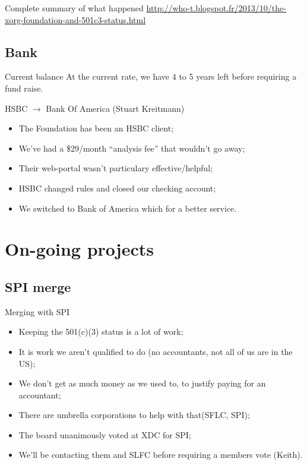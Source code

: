 \documentclass{beamer}
\begin{document}
		\begin{frame}
			\begin{block}{Complete summary of what happened}
				\url{http://who-t.blogspot.fr/2013/10/the-xorg-foundation-and-501c3-status.html}
			\end{block}
		\end{frame}

		\subsection{Bank}
		\begin{frame}
			\begin{block}{Current balance}
				At the current rate, we have 4 to 5 years left before requiring a fund raise.
			\end{block}

			\begin{block}{HSBC $\rightarrow$ Bank Of America (Stuart Kreitmann)}
				\begin{itemize}
					\item The Foundation has been an HSBC client;
					\item We've had a \$29/month ``analysis fee'' that wouldn't go away;
					\item Their web-portal wasn't particulary effective/helpful;
					\item HSBC changed rules and closed our checking account;
					\item We switched to Bank of America which for a better service.
				\end{itemize}
			\end{block}
		\end{frame}

	\section{On-going projects}
		\subsection{SPI merge}
		\begin{frame}
			\begin{block}{Merging with SPI}
				\begin{itemize}
					\item Keeping the 501(c)(3) status is a lot of work;
					\item It is work we aren't qualified to do (no accountants, not all of us are in the US);
					\item We don't get as much money as we used to, to justify paying for an accountant;
					\item There are umbrella corporations to help with that(SFLC, SPI);
					\item The board unanimously voted at XDC for SPI;
					\item We'll be contacting them and SLFC before requiring a members vote (Keith).
				\end{itemize}
			\end{block}
		\end{frame}
\end{document}
